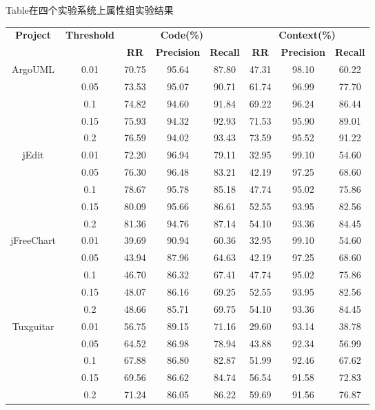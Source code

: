 \begin{table}[htbp]
{Table$\!$}{在四个实验系统上属性组实验结果}
\vspace{0.5em}\centering\wuhao
\begin{tabular}{cccccccc}
\toprule[1.5pt]
\multirow{2}{*}{\textbf{Project}}&\multirow{2}{*}{\textbf{Threshold}}&\multicolumn{3}{c}{\textbf{ Code(\%)}}&\multicolumn{3}{c}{\textbf{ Context(\%)}}\\
&&\textbf{RR}&\textbf{Precision}&\textbf{Recall}&\textbf{RR}&\textbf{Precision}&\textbf{Recall}\\
\midrule[1pt]
\multirow{5}{*}{ArgoUML}
&0.01&	70.75&	95.64&	87.80&	47.31&	98.10&	60.22\\
&0.05&	73.53&	95.07&	90.71&	61.74&	96.99&	77.70\\
&0.1&	74.82&	94.60&	91.84&	69.22&	96.24&	86.44\\
&0.15&	75.93&	94.32&	92.93&	71.53&	95.90&	89.01\\
&0.2&	76.59&	94.02&	93.43&	73.59&	95.52&	91.22\\

\multirow{5}{*}{jEdit}
&0.01&	72.20&    96.94&	79.11&	32.95&	99.10&	54.60\\
&0.05&	76.30&	96.48&	83.21&	42.19&	97.25&	68.60\\
&0.1&	78.67&	95.78&	85.18&	47.74&	95.02&	75.86\\
&0.15&	80.09&	95.66&	86.61&	52.55&	93.95&	82.56\\
&0.2&	81.36&	94.76&	87.14&	54.10&	93.36&	84.45\\


\multirow{5}{*}{jFreeChart}
&0.01&	39.69&	90.94&	60.36&	32.95&	99.10&	54.60\\
&0.05&	43.94&	87.96&	64.63&	42.19&	97.25&	68.60\\
&0.1&	46.70&	86.32&	67.41&	47.74&	95.02&	75.86\\
&0.15&	48.07&	86.16&	69.25&	52.55&	93.95&	82.56\\
&0.2&	48.66&	85.71&	69.75&	54.10&	93.36&	84.45\\


\multirow{5}{*}{Tuxguitar}
&0.01&	56.75&	89.15&	71.16&	29.60&	93.14&	38.78\\
&0.05&	64.52&	86.98&	78.94&	43.88&	92.34&	56.99\\
&0.1&	67.88&	86.80&	82.87&	51.99&	92.46&	67.62\\
&0.15&	69.56&	86.62&	84.74&	56.54&	91.58&	72.83\\
&0.2&	71.24&	86.05&	86.22&	59.69&	91.56&	76.87\\

\bottomrule[1.5pt]
\end{tabular}
\end{table}

